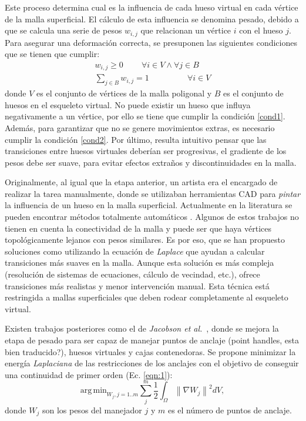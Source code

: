 Este proceso  determina cual es la influencia de cada hueso virtual en cada vértice de la malla superficial. El cálculo de esta influencia se denomina pesado, debido a que se calcula una serie de pesos $w_{i,j}$ que relacionan un vértice $i$ con el hueso $j$.
Para asegurar una deformación correcta, se presuponen las siguientes condiciones que se tienen que cumplir:
\begin{eqnarray}
\label{cond1}
w_{i,j}\geq 0 \;\;\;\;\;\;\;\; \forall i \in V \wedge \forall j \in B   \\
\label{cond2}
\sum_{j \in B} w_{i,j} = 1\ \;\;\;\;\;\;\;\;\;\;\;\;\;\;\;\;
\forall i \in V
\end{eqnarray}
donde $V$ es el conjunto de vértices de la malla poligonal y $B$ es el conjunto de huesos en el esqueleto virtual. No puede existir un hueso que influya negativamente a un vértice, por ello se tiene que cumplir la condición \ref{cond1}. Además, para garantizar que no se genere movimientos extras, es necesario cumplir la condición \ref{cond2}.
Por último, resulta intuitivo pensar que las transiciones entre huesos virtuales deberían ser progresivas, el gradiente de los pesos debe ser suave, para evitar efectos extraños y discontinuidades en la malla.

Originalmente, al igual que la etapa anterior, un artista era el encargado de realizar la tarea manualmente, donde se utilizaban herramientas \ac{CAD} para \emph{pintar} la influencia de un hueso en la malla superficial. Actualmente en la literatura se pueden encontrar métodos totalmente automáticos \cite{huang2013robust,pan2017automatic}. 
Algunos de estos trabajos no tienen en cuenta la conectividad de la malla y puede ser que haya vértices topológicamente lejanos con pesos similares. Es por eso, que se han propuesto soluciones como \cite{Baran:2007} utilizando la ecuación de \emph{Laplace} que ayudan a calcular transiciones más suaves en la malla. Aunque esta solución es más compleja (resolución de sistemas de ecuaciones, cálculo de vecindad, etc.), ofrece transiciones más realistas y menor intervención manual. Esta técnica está restringida a mallas superficiales que deben rodear completamente al esqueleto virtual.

Existen trabajos posteriores como el de \emph{Jacobson et al.}~\cite{Jacobson:2011}, donde se mejora la etapa de pesado para ser capaz de manejar puntos de anclaje (point handles, esta bien traducido?), huesos virtuales y cajas contenedoras. Se propone minimizar la energía \emph{Laplaciana} de las restricciones de los anclajes con el objetivo de conseguir una continuidad  de primer orden (Ec. \ref{eqn:1}):
\begin{equation}
\label{eqn:1}
\mathrm{arg\,min}_{W_j, j=1..m}\sum_{j}^m\frac{1}{2}\int_\Omega \left \|  \nabla W_j\right \|^2 dV,
\end{equation}
donde $W_j$ son los pesos del manejador $j$ y $m$ es el número de puntos de anclaje. 

